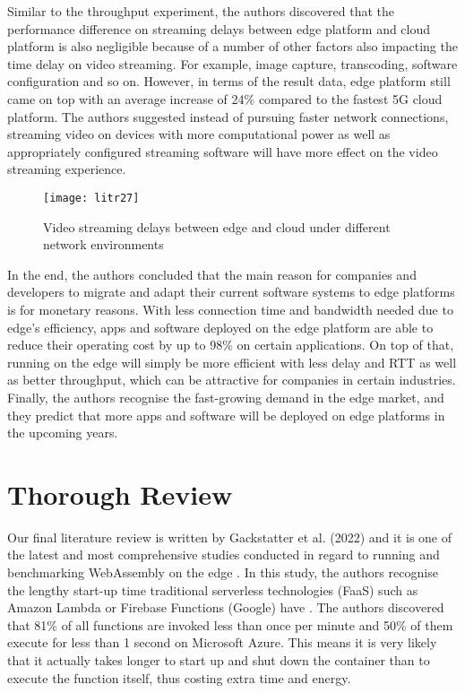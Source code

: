 Similar to the throughput experiment, the authors discovered that the performance difference on streaming delays between edge platform and cloud platform is also negligible because of a number of other factors also impacting the time delay on video streaming. For example, image capture, transcoding, software configuration and so on. However, in terms of the result data, edge platform still came on top with an average increase of 24\% compared to the fastest 5G cloud platform. The authors suggested instead of pursuing faster network connections, streaming video on devices with more computational power as well as appropriately configured streaming software will have more effect on the video streaming experience.

\begin{figure}[hp]
\centering
\texttt{[image: litr27]}
\caption{\footnotesize{Video streaming delays between edge and cloud under different network environments \cite{lit41}}}
\captionsetup{aboveskip=0pt,font=it}
\end{figure}
\bigskip

In the end, the authors concluded that the main reason for companies and developers to migrate and adapt their current software systems to edge platforms is for monetary reasons. With less connection time and bandwidth needed due to edge’s efficiency, apps and software deployed on the edge platform are able to reduce their operating cost by up to 98\% on certain applications. On top of that, running on the edge will simply be more efficient with less delay and RTT as well as better throughput, which can be attractive for companies in certain industries. Finally, the authors recognise the fast-growing demand in the edge market, and they predict that more apps and software will be deployed on edge platforms in the upcoming years.

\bigskip
\section{Thorough Review}

Our final literature review is written by Gackstatter et al. (2022) and it is one of the latest and most comprehensive studies conducted in regard to running and benchmarking WebAssembly on the edge \cite{lit43}. In this study, the authors recognise the lengthy start-up time traditional serverless technologies (FaaS) such as Amazon Lambda or Firebase Functions (Google) have \cite{lit30} \cite{lit44}. The authors discovered that 81\% of all functions are invoked less than once per minute and 50\% of them execute for less than 1 second on Microsoft Azure. This means it is very likely that it actually takes longer to start up and shut down the container than to execute the function itself, thus costing extra time and energy.

